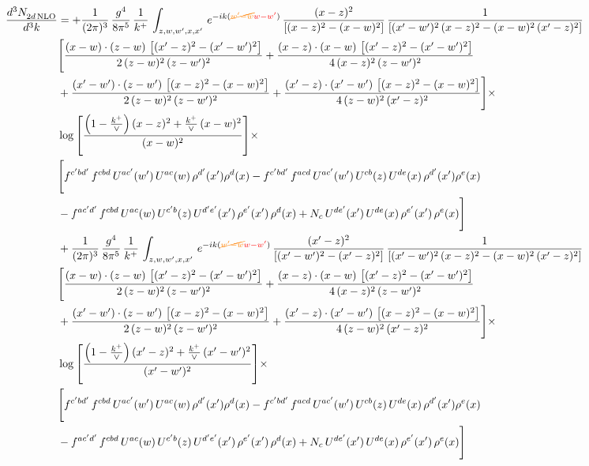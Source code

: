 \documentclass[9pt]{article}
\numberwithin{equation}{section}
\begin{document}
\begin{align}
 \frac{d^{3}N_{2d\,\rm NLO}^{\rm}}{d^{3}k}  & =   +\frac{1}{(2\pi)^{3}}\, \frac{g^{4}}{8\pi^{5}}\,\frac{1}{k^{+}}\,\int_{z,w,w^{\prime},x,x'}\, e^{-ik({\color{orange}\cancel{w^{\prime}-w}}{\color{red}w-w^{\prime}})}\,\frac{(x-z)^{2}}{\left[(x-z)^{2}-(x-w)^{2}\right]}\,\frac{1}{\left[(x'-w')^{2}\,(x-z)^{2} - (x-w)^{2}\,(x'-z)^{2}\right]}\notag \\ & \Bigg[\frac{(x-w)\cdot (z-w)\, \left[(x'-z)^{2}-(x'-w')^{2}\right]}{2\, (z-w)^{2}\, (z-w')^{2}}  + \frac{(x-z)\cdot (x-w)\,\left[(x'-z)^{2}-(x'-w')^{2}\right] }{4\,(x-z)^{2}\,(z-w')^{2}}\notag \\ & +\frac{(x'-w')\cdot (z-w')\, \left[(x-z)^{2}-(x-w)^{2}\right]}{2\, (z-w)^{2}\, (z-w')^{2}}+ \frac{(x'-z)\cdot (x'-w')\, \left[(x-z)^{2}-(x-w)^{2}\right]}{4\, (z-w)^{2}\,(x'-z)^{2}}\Bigg]\times\,\notag \\ & \log{\left[\frac{\left(1-\frac{k^{+}}{\vee}\right)(x-z)^{2}+\frac{k^{+}}{\vee}\,(x-w)^{2}}{(x-w)^{2}}\right]} \times\notag \\ & \Bigg[f^{c'bd'}\,f^{cbd}\, U^{ac'}(w')\,U^{ac}(w)\,\rho^{d'}(x')\rho^{d}(x)- f^{c'bd'}\,f^{acd}\,U^{ac'}(w')\,U^{cb}(z)\,U^{de}(x)\,\rho^{d'}(x')\rho^{e}(x) \notag \\ & -f^{ac'd'}\,f^{cbd}\,U^{ac}(w)\,U^{c'b}(z)\,U^{d'e'}(x')\,\rho^{e'}(x')\,\rho^{d}(x) +N_{c}\,U^{de'}(x')\,U^{de}(x)\,\rho^{e'}(x')\,\rho^{e}(x)\Bigg] \notag \\
& +\frac{1}{(2\pi)^{3}}\, \frac{g^{4}}{8\pi^{5}}\,\frac{1}{k^{+}}\,\int_{z,w,w^{\prime},x,x'}\, e^{-ik({\color{orange}\cancel{w^{\prime}-w}}{\color{red}w-w^{\prime}})}\,\frac{(x'-z)^{2}}{\left[(x'-w')^{2}-(x'-z)^{2}\right]}\,\frac{1}{\left[(x'-w')^{2}\,(x-z)^{2} - (x-w)^{2}\,(x'-z)^{2}\right]}\notag \\ & \Bigg[\frac{(x-w)\cdot (z-w)\, \left[(x'-z)^{2}-(x'-w')^{2}\right]}{2\, (z-w)^{2}\, (z-w')^{2}}  + \frac{(x-z)\cdot (x-w)\,\left[(x'-z)^{2}-(x'-w')^{2}\right] }{4\,(x-z)^{2}\,(z-w')^{2}}\notag \\ & +\frac{(x'-w')\cdot (z-w')\, \left[(x-z)^{2}-(x-w)^{2}\right]}{2\, (z-w)^{2}\, (z-w')^{2}}+ \frac{(x'-z)\cdot (x'-w')\, \left[(x-z)^{2}-(x-w)^{2}\right]}{4\, (z-w)^{2}\,(x'-z)^{2}}\Bigg]\times\,\notag \\ & \log{\left[\frac{\left(1-\frac{k^{+}}{\vee}\right)(x'-z)^{2}+\frac{k^{+}}{\vee}\,(x'-w')^{2}}{(x'-w')^{2}}\right]} \times\notag \\ & \Bigg[f^{c'bd'}\,f^{cbd}\, U^{ac'}(w')\,U^{ac}(w)\,\rho^{d'}(x')\rho^{d}(x)- f^{c'bd'}\,f^{acd}\,U^{ac'}(w')\,U^{cb}(z)\,U^{de}(x)\,\rho^{d'}(x')\rho^{e}(x) \notag \\ & -f^{ac'd'}\,f^{cbd}\,U^{ac}(w)\,U^{c'b}(z)\,U^{d'e'}(x')\,\rho^{e'}(x')\,\rho^{d}(x) +N_{c}\,U^{de'}(x')\,U^{de}(x)\,\rho^{e'}(x')\,\rho^{e}(x)\Bigg]
\end{align}
\end{document}
